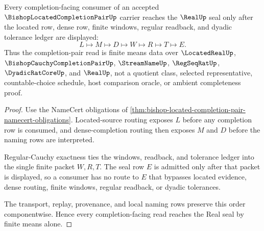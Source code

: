 \begin{theorem}
\label{thm:bishop-located-completion-pair-finite-means}
Every completion-facing consumer of an accepted $\BishopLocatedCompletionPairUp$ carrier reaches the $\RealUp$ seal only after the located row, dense row, finite windows, regular readback, and dyadic tolerance ledger are displayed:
$$
L \longmapsto M \longmapsto D \longmapsto W \longmapsto R \longmapsto T \longmapsto E.
$$
Thus the completion-pair read is finite means data over $\LocatedRealUp$, $\BishopCauchyCompletionPairUp$, $\StreamNameUp$, $\RegSeqRatUp$, $\DyadicRatCoreUp$, and $\RealUp$, not a quotient class, selected representative, countable-choice schedule, host comparison oracle, or ambient completeness proof.
\end{theorem}
\begin{proof}
Use the NameCert obligations of \autoref{thm:bishop-located-completion-pair-namecert-obligations}. Located-source routing exposes $L$ before any completion row is consumed, and dense-completion routing then exposes $M$ and $D$ before the naming rows are interpreted.

Regular-Cauchy exactness ties the windows, readback, and tolerance ledger into the single finite packet $W,R,T$. The seal row $E$ is admitted only after that packet is displayed, so a consumer has no route to $E$ that bypasses located evidence, dense routing, finite windows, regular readback, or dyadic tolerances.

The transport, replay, provenance, and local naming rows preserve this order componentwise. Hence every completion-facing read reaches the Real seal by finite means alone.
\end{proof}


